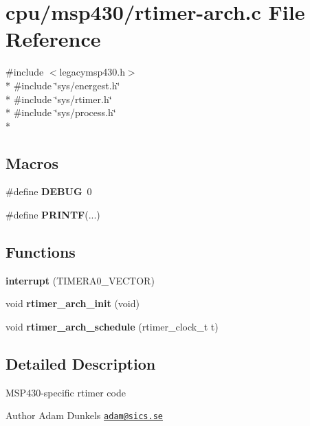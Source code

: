 \hypertarget{rtimer-arch_8c}{\section{cpu/msp430/rtimer-\/arch.c File Reference}
\label{rtimer-arch_8c}
}
{\ttfamily \#include $<$legacymsp430.\-h$>$}\\*
{\ttfamily \#include \char`\"{}sys/energest.\-h\char`\"{}}\\*
{\ttfamily \#include \char`\"{}sys/rtimer.\-h\char`\"{}}\\*
{\ttfamily \#include \char`\"{}sys/process.\-h\char`\"{}}\\*
\subsection*{Macros}
\begin{DoxyCompactItemize}
\item 
\hypertarget{rtimer-arch_8c_ad72dbcf6d0153db1b8d8a58001feed83}{\#define {\bfseries D\-E\-B\-U\-G}~0}\label{rtimer-arch_8c_ad72dbcf6d0153db1b8d8a58001feed83}

\item 
\hypertarget{rtimer-arch_8c_a1f464e950a4fa11e8821b5c725921a15}{\#define {\bfseries P\-R\-I\-N\-T\-F}(...)}\label{rtimer-arch_8c_a1f464e950a4fa11e8821b5c725921a15}

\end{DoxyCompactItemize}
\subsection*{Functions}
\begin{DoxyCompactItemize}
\item 
\hypertarget{rtimer-arch_8c_ae0992854bdba99f7b163894433c32aef}{{\bfseries interrupt} (T\-I\-M\-E\-R\-A0\-\_\-\-V\-E\-C\-T\-O\-R)}\label{rtimer-arch_8c_ae0992854bdba99f7b163894433c32aef}

\item 
\hypertarget{group__rt_gaa52e494f9a26390231d998237b1b849a}{void {\bfseries rtimer\-\_\-arch\-\_\-init} (void)}\label{group__rt_gaa52e494f9a26390231d998237b1b849a}

\item 
\hypertarget{group__rt_gac69ae14f718f5f7b78b101a034d67c3a}{void {\bfseries rtimer\-\_\-arch\-\_\-schedule} (rtimer\-\_\-clock\-\_\-t t)}\label{group__rt_gac69ae14f718f5f7b78b101a034d67c3a}

\end{DoxyCompactItemize}


\subsection{Detailed Description}
\begin{DoxyVerb}    MSP430-specific rtimer code
\end{DoxyVerb}
 \begin{DoxyAuthor}{Author}
Adam Dunkels \href{mailto:adam@sics.se}{\tt adam@sics.\-se} 
\end{DoxyAuthor}
